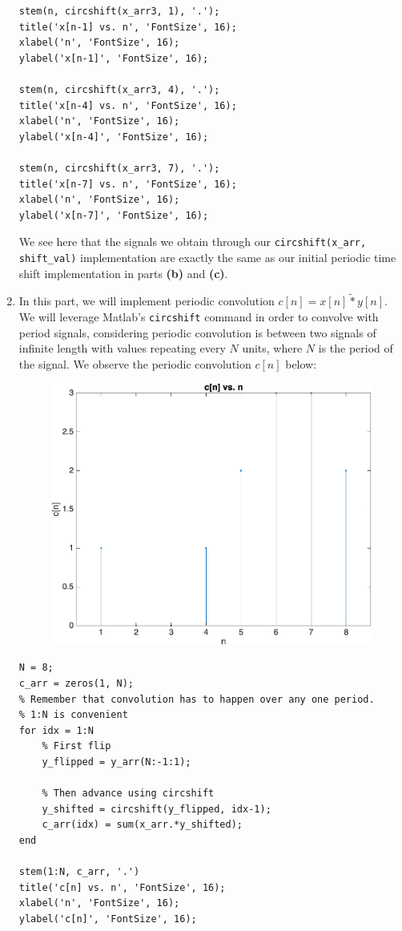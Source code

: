 \documentclass[12pt]{article}
\begin{document}
\begin{enumerate}[label=\textbf{\alph*)}, leftmargin=2.6em]
\begin{verbatim}
stem(n, circshift(x_arr3, 1), '.');
title('x[n-1] vs. n', 'FontSize', 16);
xlabel('n', 'FontSize', 16);
ylabel('x[n-1]', 'FontSize', 16);

stem(n, circshift(x_arr3, 4), '.');
title('x[n-4] vs. n', 'FontSize', 16);
xlabel('n', 'FontSize', 16);
ylabel('x[n-4]', 'FontSize', 16);

stem(n, circshift(x_arr3, 7), '.');
title('x[n-7] vs. n', 'FontSize', 16);
xlabel('n', 'FontSize', 16);
ylabel('x[n-7]', 'FontSize', 16);
\end{verbatim}
We see here that the signals we obtain through our \verb|circshift(x_arr, shift_val)| implementation are exactly the same as our initial periodic time shift implementation in parts \textbf{(b)} and \textbf{(c)}.

\item In this part, we will implement periodic convolution $c[n]=x[n]\tilde{\ast}y[n]$. We will leverage Matlab's \verb|circshift| command in order to convolve with period signals, considering periodic convolution is between two signals of infinite length with values repeating every $N$ units, where $N$ is the period of the signal. We observe the periodic convolution $c[n]$ below:
\begin{figure}[H]
    \centering
    \includegraphics[width=0.5\linewidth]{conv1.png}
\end{figure}
\begin{verbatim}
N = 8;
c_arr = zeros(1, N);
% Remember that convolution has to happen over any one period. 
% 1:N is convenient
for idx = 1:N
    % First flip
    y_flipped = y_arr(N:-1:1);

    % Then advance using circshift
    y_shifted = circshift(y_flipped, idx-1);
    c_arr(idx) = sum(x_arr.*y_shifted);
end

stem(1:N, c_arr, '.')
title('c[n] vs. n', 'FontSize', 16);
xlabel('n', 'FontSize', 16);
ylabel('c[n]', 'FontSize', 16);
\end{verbatim}


\end{enumerate}
\end{document}

